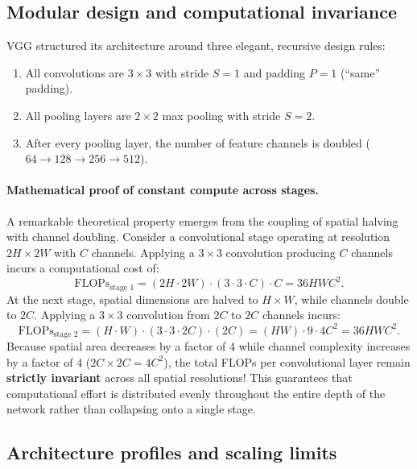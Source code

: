\subsection{Modular design and computational invariance}
\label{sec:vgg_modular_invariance}

VGG structured its architecture around three elegant, recursive design rules:
\begin{enumerate}[noitemsep]
  \item All convolutions are $3 \times 3$ with stride $S = 1$ and padding $P = 1$ (``same'' padding).
  \item All pooling layers are $2 \times 2$ max pooling with stride $S = 2$.
  \item After every pooling layer, the number of feature channels is doubled ($64 \to 128 \to 256 \to 512$).
\end{enumerate}

\paragraph{Mathematical proof of constant compute across stages.}
A remarkable theoretical property emerges from the coupling of spatial halving with channel doubling. Consider a convolutional stage operating at resolution $2H \times 2W$ with $C$ channels. Applying a $3 \times 3$ convolution producing $C$ channels incurs a computational cost of:
\begin{equation}
\text{FLOPs}_{\text{stage } 1} = (2H \cdot 2W) \cdot (3 \cdot 3 \cdot C) \cdot C = 36 H W C^2.
\label{eq:vgg_flops_stage1}
\end{equation}
At the next stage, spatial dimensions are halved to $H \times W$, while channels double to $2C$. Applying a $3 \times 3$ convolution from $2C$ to $2C$ channels incurs:
\begin{equation}
\text{FLOPs}_{\text{stage } 2} = (H \cdot W) \cdot (3 \cdot 3 \cdot 2C) \cdot (2C) = (HW) \cdot 9 \cdot 4C^2 = 36 H W C^2.
\label{eq:vgg_flops_stage2}
\end{equation}
Because spatial area decreases by a factor of 4 while channel complexity increases by a factor of 4 ($2C \times 2C = 4C^2$), the total FLOPs per convolutional layer remain \textbf{strictly invariant} across all spatial resolutions! This guarantees that computational effort is distributed evenly throughout the entire depth of the network rather than collapsing onto a single stage.

\subsection{Architecture profiles and scaling limits}
\label{sec:vgg_scaling_limits}

